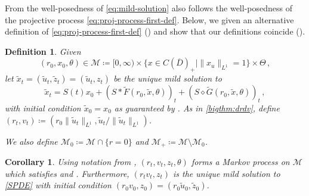 \documentclass[final]{amsart}
\newtheorem{deff}[thm]{Definition}
\newtheorem{cor}[thm]{Corollary}
\numberwithin{thm}{section}
\numberwithin{equation}{section}
\newcommand{\mcM}{\mathcal{M}}
\newcommand{\inv}{\mathcal{M}_+}
\newcommand{\cdom}{C(\overline D)_+}
\begin{document}
From the well-posedness of \eqref{eq:mild-solution} also follows the well-posedness of the projective process \eqref{eq:proj-process-first-def}. Below, we given an alternative definition of \eqref{eq:proj-process-first-def} () and show that our definitions coincide ().

\begin{deff}\label{def:rv-process}
    Given
    $$(r_0,x_0,\theta) \in \mcM \coloneqq [0,\infty) \times \{x \in \cdom \mid \|x_u\|_{L^1} = 1\} \times \Theta \,,$$
    let $\tilde{x}_t = (\tilde{u}_t, \tilde{z}_t)=(\tilde{u}_t, z_t)$ be the unique mild solution to
    $$
    \tilde{x}_t = S(t)x_0 + (S * \tilde F(r_0,\tilde{x},\theta))_t + (S \diamond \tilde G(r_0, \tilde{x},\theta))_t \,,$$
    with initial condition $\tilde{x}_0 = x_0$
    as guaranteed by . As in  \ref{bigthm:drdv}, define $(r_t,v_t) \coloneqq (r_0\|\tilde{u}_t\|_{L^1}, \tilde{u}_t/\|\tilde{u}_t\|_{L^1})$.
    

    We also define $\mcM_0 \coloneqq \mcM \cap \{r = 0\}$ and $\inv \coloneqq \mcM \setminus \mcM_0$.
\end{deff}



\begin{cor}\label{rv-is-markov-process}
     Using notation from ,   $(r_t,v_t, z_t,\theta)$ forms a Markov process on $\mcM$ which satisfies  and . Furthermore, $(r_tv_t,z_t)$ is the unique mild solution to \eqref{SPDE} with initial condition $(r_0v_0,z_0) = (r_0 \tilde{u}_0, \tilde{z}_0)$.
\end{cor}
\end{document}
